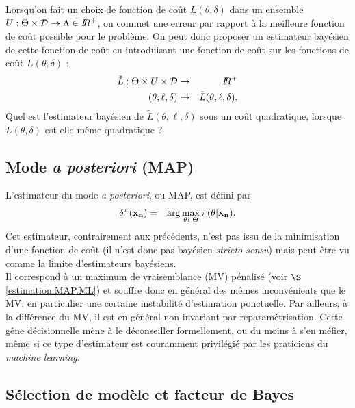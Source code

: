 \begin{exec}
Lorsqu'on fait un choix de fonction de coût $L(\theta,\delta)$ dans un ensemble $U:\Theta\times{\cal{D}}\to\Lambda\in I\!\!R^+$, on commet une erreur par rapport à la meilleure fonction de coût possible pour le problème. On peut donc proposer un estimateur bayésien de cette fonction de coût en introduisant une fonction de coût sur les fonctions de coût $L(\theta,\delta)$ :
\begin{eqnarray*}
\tilde{L}: \Theta\times U \times {\cal{D}}  & \to & I\!\!R^+ \\
(\theta,\ell,\delta) & \mapsto & \tilde{L}(\theta,\ell,\delta).
\end{eqnarray*}
Quel est l'estimateur bayésien de $\tilde{L}(\theta,\ell,\delta)$ sous un coût quadratique, lorsque $L(\theta,\delta)$ est elle-même quadratique ?
\end{exec}

\if{} 
\fi




\subsection{Mode {\it a posteriori} (MAP)}

L'estimateur du  mode {\it a posteriori}, ou MAP, est défini par
\begin{eqnarray*}
\delta^{\pi}({\bf x_n}) & = & \arg\max\limits_{\theta\in\Theta} \pi(\theta|{\bf x_n}).
\end{eqnarray*}
Cet estimateur, contrairement aux précédents, n'est pas issu de la minimisation d'une fonction de coût (il n'est donc pas bayésien {\it stricto sensu}) mais peut être vu comme la limite d'estimateurs bayésiens. \\

Il correspond à un maximum de vraisemblance (MV) pénalisé (voir $\S$ \ref{estimation.MAP.ML}) et souffre donc en général des mêmes  inconvénients que le MV, en particulier une certaine instabilité d'estimation ponctuelle. Par ailleurs, à la différence du MV, il est en général non invariant par reparamétrisation. Cette gêne décisionnelle mène à le déconseiller formellement, ou du moins à s'en méfier, même si ce type d'estimateur est couramment privilégié par les praticiens du \textit{machine learning}. 


\subsection{Sélection de modèle et facteur de Bayes}\label{test}

